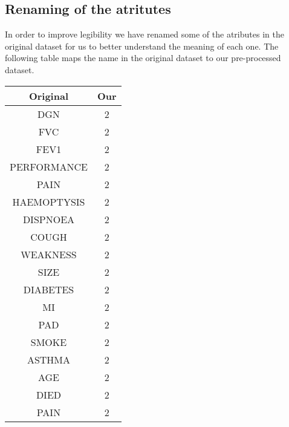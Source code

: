 \subsection{Renaming of the atritutes}

In order to improve legibility we have renamed some of the atributes in the original dataset for us to better understand the meaning of each one. The following table maps the name in the original dataset to our pre-processed dataset.

\begin{center}

\begin{tabular}{|c|c|}
    \hline
    \textbf{Original} & \textbf{Our} \\ \hline\hline
    DGN & 2 \\ \hline
    FVC & 2 \\ \hline
    FEV1 & 2 \\ \hline
    PERFORMANCE & 2 \\ \hline
    PAIN & 2 \\ \hline
    HAEMOPTYSIS & 2 \\ \hline
    DISPNOEA & 2 \\ \hline
    COUGH & 2 \\ \hline
    WEAKNESS & 2 \\ \hline
    SIZE & 2 \\ \hline
    DIABETES & 2 \\ \hline
    MI & 2 \\ \hline
    PAD & 2 \\ \hline
    SMOKE & 2 \\ \hline
    ASTHMA & 2 \\ \hline
    AGE & 2 \\ \hline
    DIED & 2 \\ \hline
    PAIN & 2 \\ \hline

\end{tabular}
\end{center}



